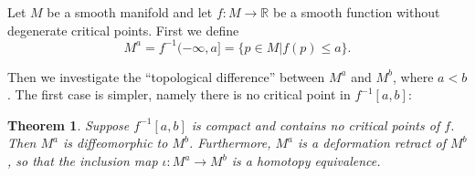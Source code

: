 \documentclass[a4paper,11pt,reqno]{amsart}
\newtheorem{thm}{Theorem}[section]
\newcommand{\RR}{\mathbb{R}}      %
\begin{document}
Let $M$ be a smooth manifold and let $f: M \to \RR$ be a smooth function without
degenerate critical points. First we define
\begin{equation}
  M^a = f^{-1}(-\infty, a] = \{ p \in M | f(p) \le a \}.
\end{equation}

Then we investigate the ``topological difference'' between $M^a$ and $M^b$,
where $a < b$. The first case is simpler, namely there is no critical point in
$f^{-1}[a,b]$:

\begin{thm}
  \label{3.1}
  Suppose $f^{-1}[a,b]$ is compact and contains no critical points of $f$. Then
  $M^a$ is diffeomorphic to $M^b$. Furthermore, $M^a$ is a deformation retract
  of $M^b$, so that the inclusion map $\iota : M^a \to M^b$ is a homotopy
  equivalence.
\end{thm}
\end{document}
